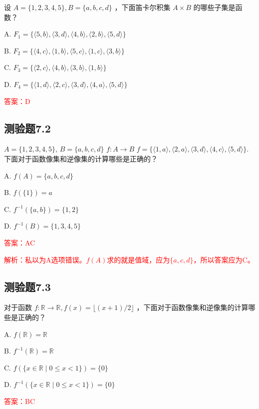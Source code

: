 \documentclass[UTF8, heading=true]{ctexart}
\begin{document}
设 $A=\{1,2,3,4,5\}, B=\{a, b, c, d\}$ ，下面笛卡尔积集 $A \times B$ 的哪些子集是函数？

A. $F_1=\{\langle 5, b\rangle,\langle 3, d\rangle,\langle 4, b\rangle,\langle 2, b\rangle,\langle 5, d\rangle\}$

B. $F_2=\{\langle 4, c\rangle,\langle 1, b\rangle,\langle 5, c\rangle,\langle 1, c\rangle,\langle 3, b\rangle\}$

C. $F_3=\{\langle 2, c\rangle,\langle 4, b\rangle,\langle 3, b\rangle,\langle 1, b\rangle\}$

D. $F_4=\{\langle 1, d\rangle,\langle 2, c\rangle,\langle 3, d\rangle,\langle 4, a\rangle,\langle 5, d\rangle\}$



\textcolor{red}{答案：D}

\subsection{测验题7.2}


 $A=\{1,2,3,4,5\}$, $B=\{a, b, c, d\}$  $f: A \rightarrow B$  $f=\{\langle 1, a\rangle,\langle 2, a\rangle,\langle 3, d\rangle,\langle 4, c\rangle,\langle 5, d\rangle\}$.
下面对于函数像集和逆像集的计算哪些是正确的？

A. 
$f(A)=\{a, b, c, d\}$

B. 
$f(\{1\})=a$

C. $f^{-1}(\{a, b\})=\{1,2\}$

D. $f^{-1}(B)=\{1,3,4,5\}$

\textcolor{red}{答案：AC}

\textcolor{red}{解析：私以为A选项错误。$f(A)$求的就是值域，应为$\{ a,c,d \}$，所以答案应为C。}

\subsection{测验题7.3}

对于函数 $f: \mathbb{R} \rightarrow \mathbb{R}, f(x)=\lfloor(x+1) / 2\rfloor$ ，下面对于函数像集和逆像集的计算哪些是正确的？

A. $f(\mathbb{R})=\mathbb{R}$

B. $f^{-1}(\mathbb{R})=\mathbb{R}$

C. $f(\{x \in \mathbb{R} \mid 0 \leq x<1\})=\{0\}$

D. $f^{-1}(\{x \in \mathbb{R} \mid 0 \leq x<1\})=\{0\}$

\textcolor{red}{答案：BC}
\end{document}
